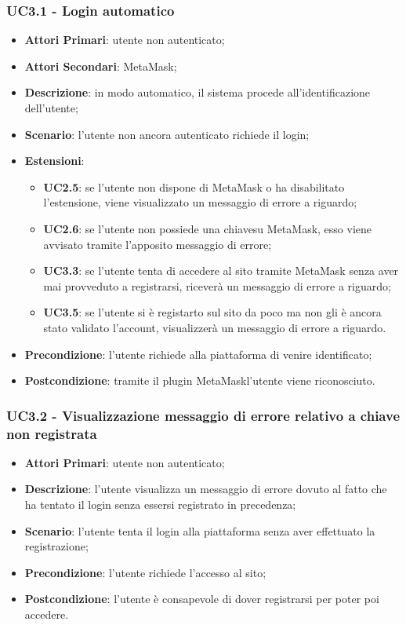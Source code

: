 \subsubsection{UC3.1 - Login automatico}
\begin{itemize}
	\item \textbf{Attori Primari}:
	utente non autenticato;
	\item \textbf{Attori Secondari}:
	MetaMask\glo;
	\item \textbf{Descrizione}:
	in modo automatico, il sistema procede all'identificazione dell'utente;
	\item \textbf{Scenario}:
	l'utente non ancora autenticato richiede il login;
	\item \textbf{Estensioni}:
	\begin{itemize}
		\item \textbf{UC2.5}: se l'utente non dispone di MetaMask o ha disabilitato l'estensione, viene visualizzato un messaggio di errore a riguardo;
		\item \textbf{UC2.6}: se l'utente non possiede una chiave\glosp su MetaMask\glo, esso viene avvisato tramite l'apposito messaggio di errore;
		\item \textbf{UC3.3}: se l'utente tenta di accedere al sito tramite MetaMask senza aver mai provveduto a registrarsi, riceverà un messaggio di errore a riguardo;
		\item \textbf{UC3.5}: se l'utente si è registarto sul sito da poco ma non gli è ancora stato validato l'account, visualizzerà un messaggio di errore a riguardo.
	\end{itemize}
	\item \textbf{Precondizione}:
	l'utente richiede alla piattaforma di venire identificato;
	\item \textbf{Postcondizione}:
	tramite il plugin MetaMask\glo l'utente viene riconosciuto.
\end{itemize}
\subsubsection{UC3.2 - Visualizzazione messaggio di errore relativo a chiave non registrata}
\begin{itemize}
	\item \textbf{Attori Primari}:
	utente non autenticato;
	\item \textbf{Descrizione}:
	l'utente visualizza un messaggio di errore dovuto al fatto che ha tentato il login senza essersi registrato in precedenza;
	\item \textbf{Scenario}:
	l'utente tenta il login alla piattaforma senza aver effettuato la registrazione;
	\item \textbf{Precondizione}:
	l'utente richiede l'accesso al sito;
	\item \textbf{Postcondizione}:
	l'utente è consapevole di dover registrarsi per poter poi accedere.
\end{itemize}

